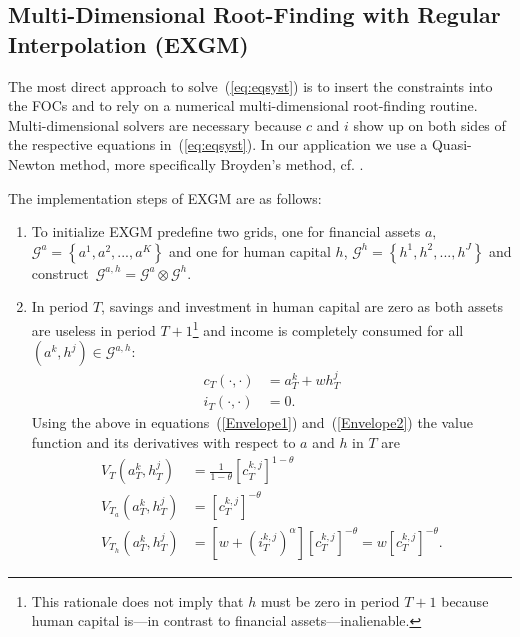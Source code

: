 \documentclass[a4paper,12pt]{article}%
\begin{document}
\subsection{Multi-Dimensional Root-Finding with Regular Interpolation (EXGM)}

The most direct approach to solve~(\ref{eq:eqsyst}) is to insert the constraints into the FOCs and to rely on a numerical multi-dimensional root-finding routine. Multi-dimensional solvers are necessary because $c$ and $i$ show up on both sides of the respective equations in~(\ref{eq:eqsyst}). In our application we use a Quasi-Newton method, more specifically Broyden's method, cf. .

The implementation steps of EXGM are as follows:

\begin{enumerate}
\item To initialize EXGM predefine two grids, one for financial assets $a,$ $\mathcal{G}^{a}=\left\{ a^{1},a^{2},...,a^{K}\right\}$ and one for human capital $h$, $\mathcal{G}^{h}=\left\{  h^{1},h^{2},...,h^{J}\right\}$ and construct~$\mathcal{G}^{a,h}=\mathcal{G}^{a}\otimes\mathcal{G}^{h}$.

\item In period $T$, savings and investment in human capital are zero as both assets are useless in period $T+1$\footnote{This rationale does not imply that $h$ must be zero in period $T+1$ because human capital is---in contrast to financial assets---inalienable.}
and income is completely consumed for all $\left(  a^{k},h^{j}\right)  \in\mathcal{G}^{a,h}$:
\begin{align*}
c_{T}\left( \cdot,\cdot\right)  &  =a_{T}^{k}+wh_{T}^{j}\\
i_{T}\left( \cdot,\cdot\right)  &  =0\text{.}
\end{align*}
Using the above in equations~(\ref{Envelope1}) and~(\ref{Envelope2}) the value function and its derivatives with respect to $a$ and $h$ in $T$ are
\begin{align*}
V_{T}\left(  a_{T}^{k},h_{T}^{j}\right)   &  =\frac{1}{1-\theta}\left[c_{T}^{k,j}\right]  ^{1-\theta}\\
\text{$V_{T_{a}}$}\left(  a_{T}^{k},h_{T}^{j}\right)   &  =\left[  c_{T}^{k,j}\right]  ^{-\theta}\\
\text{$V_{T_{h}}$}\left(  a_{T}^{k},h_{T}^{j}\right)   &  =\left[  w+ \left(i_{T}^{k,j}\right)  ^{\alpha}\right]  \left[  c_{T}^{k,j}\right]  ^{-\theta}=w\left[  c_{T}^{k,j}\right]  ^{-\theta}\text{.}
\end{align*}


\end{enumerate}
\end{document}
